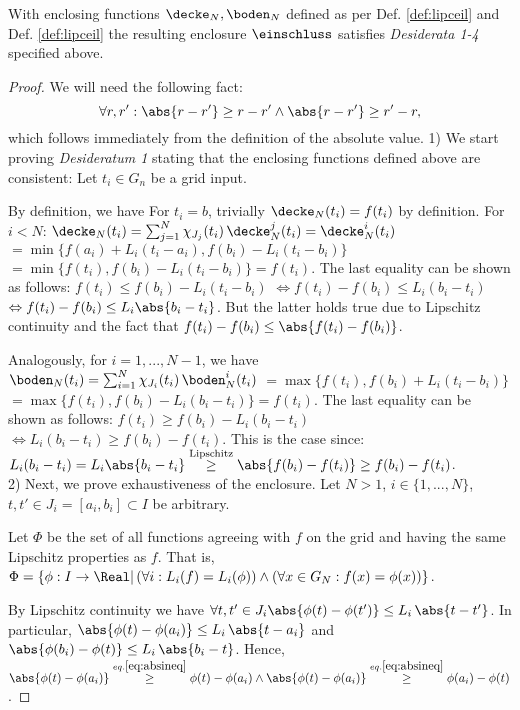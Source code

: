 \begin{thm} \label{thm:enclosure1d_desiderata}
With enclosing functions $\decke_N, \boden_N$ defined as per Def.
\ref{def:lipceil} and Def. \ref{def:lipceil} the resulting enclosure
$\einschluss$ satisfies \textit{Desiderata 1-4} specified above.
\begin{proof}
We will need the following fact:
\begin{equation} \label{eq:absineq}
\forall r,r': \abs{r -r'} \geq r -r' \wedge \abs{r -r'} \geq r' -r,
\end{equation}
which follows immediately from the definition of the absolute value.
1) We start proving \textit{Desideratum 1} stating that the enclosing functions defined above are consistent: Let $t_i \in G_n$ be a grid input. 

By definition, we have 
For $t_i =b$, trivially $\decke_N (t_i) = f(t_i)$ by definition. 
For $i < N$:
$ \decke_N (t_i) =   \sum_{j=1}^{N}  \chi_{J_j}(t_i) \,\decke^j_N(t_i) = \decke^i_N(t_i)$
$= \min\{f(a_i) + L_i (t_i - a_i), f(b_i) -L_i (t_i - b_i)\}$ 
$= \min\{f(t_i), f(b_i) -L_i (t_i - b_i)\} = f(t_i)$. The last equality can be shown as follows:
$f(t_i)\leq f(b_i) -L_i (t_i - b_i)$
$\Leftrightarrow f(t_i) - f(b_i) \leq  L_i (b_i - t_i)$
$\Leftrightarrow f(t_i) - f(b_i) \leq  L_i \abs{b_i - t_i}$.
But the latter holds true due to Lipschitz continuity and the fact that 
$f(t_i) - f(b_i) \leq \abs{f(t_i) - f(b_i)}$.

Analogously, for $i=1,...,N-1$, we have 
$ \boden_N (t_i) =  \sum_{i=1}^{N}  \chi_{J_i}(t_i) \,\boden^i_N(t_i)$
$= \max\{f(t_i), f(b_i) +L_i (t_i - b_i)\}$ 
 $= \max\{f(t_i), f(b_i) -L_i (b_i -t_i)\}  = f(t_i)$. The last equality can be shown as follows:
$f(t_i)\geq f(b_i) -L_i (b_i -t_i)$
$\Leftrightarrow L_i (b_i -t_i) \geq f(b_i) - f(t_i)$.
This is the case since: $L_i (b_i -t_i) = L_i \abs{b_i-t_i} \stackrel{\text{Lipschitz}}{\geq} \abs{f(b_i) - f(t_i)} \geq f(b_i) - f(t_i)$.\\

2) Next, we prove exhaustiveness of the enclosure.  
Let $N > 1$, $i \in \{1,...,N \}$, $t,t' \in J_i = [a_i,b_i] \subset
I$ be arbitrary.

Let $\Phi$ be the set of all functions agreeing with $f$ on the grid
and having the same Lipschitz properties as $f$. That is, $\Phi = \{
\phi: I \to \Real| \, (\forall i: L_i(f) = L_i(\phi)) \wedge
(\forall x \in G_N: f(x) = \phi(x)) \}$.

By Lipschitz continuity we have $\forall t,t' \in J_i \abs{\phi(t)
-\phi(t')} \leq L_{i} \, \abs{t-t'}$. In particular, $\abs{\phi(t)
-\phi(a_i)} \leq L_{i} \, \abs{t-a_i}$ and $\abs{\phi(b_i) -\phi(t)}
\leq L_{i} \, \abs{b_i -t}$. Hence, $\abs{\phi(t) - \phi(a_i)}
\stackrel{eq. \ref{eq:absineq}}{\geq} \phi(t) - \phi(a_i)
\wedge\abs{\phi(t) - \phi(a_i)} \stackrel{eq.
\ref{eq:absineq}}{\geq} \phi(a_i) - \phi(t)$.


\end{proof}
\end{thm}
